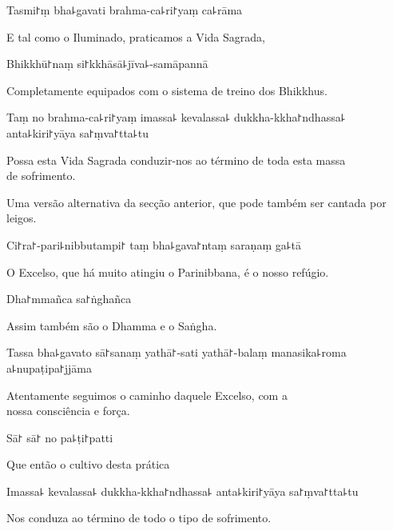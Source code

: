 Tasmi꜓ṃ bha꜕gavati brahma-ca꜕ri꜓yaṃ ca꜕rāma

\begin{english}
  E tal como o Iluminado, praticamos a Vida Sagrada, 
\end{english}

Bhikkhū꜓naṃ si꜓kkhāsā꜕jīva꜕-samāpannā

\begin{english}
  Completamente equipados com o sistema de treino dos Bhikkhus.
\end{english}

Taṃ no brahma-ca꜕ri꜓yaṃ imassa꜕ kevalassa꜕ dukkha-kkha꜓ndhassa꜕ anta꜕kiri꜓yāya sa꜓ṃva꜓tta꜕tu

\begin{english}
  Possa esta Vida Sagrada conduzir-nos ao término de toda esta massa\\  de sofrimento.
\end{english}

\begin{instruction}
  Uma versão alternativa da secção anterior, que pode também ser cantada por leigos.
\end{instruction}

Ci꜓ra꜓-pari꜕nibbutampi꜓ taṃ bha꜕gava꜓ntaṃ saraṇaṃ ga꜕tā

\begin{english}
  O Excelso, que há muito atingiu o Parinibbana, é o nosso refúgio.
\end{english}

Dha꜓mmañca sa꜓ṅghañca

\begin{english}
  Assim também são o Dhamma e o Saṅgha.
\end{english}

Tassa bha꜕gavato sā꜓sanaṃ yathā꜓-sati yathā꜓-balaṃ manasika꜕roma a꜕nupaṭipa꜓jjāma

\begin{english}
  Atentamente seguimos o caminho daquele Excelso, com  a\\ nossa consciência e força.
\end{english}

Sā꜓ sā꜓ no pa꜕ṭi꜓patti

\begin{english}
  Que então o cultivo desta prática
\end{english}

Imassa꜕ kevalassa꜕ dukkha-kkha꜓ndhassa꜕ anta꜕kiri꜓yāya sa꜓ṃva꜓tta꜕tu

\begin{english}
  Nos conduza ao término de todo o tipo de sofrimento.
\end{english}

